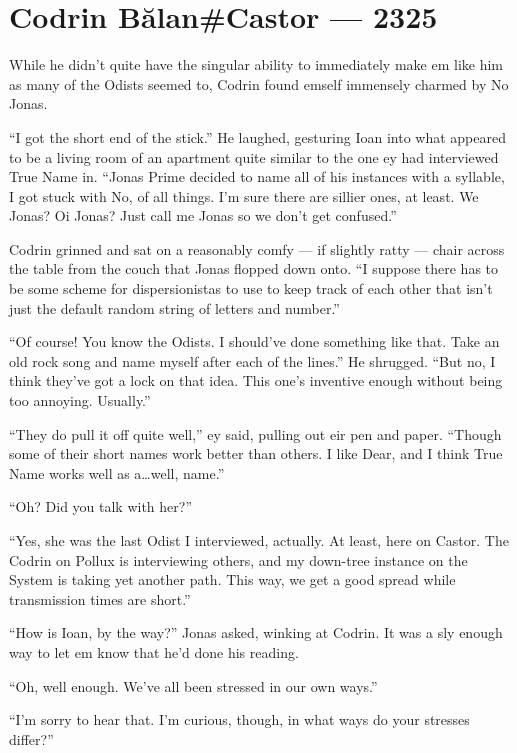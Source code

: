 \hypertarget{codrin-bux103lancastor-2325}{%
\chapter{Codrin Bălan\#Castor — 2325}\label{codrin-bux103lancastor-2325}}

While he didn't quite have the singular ability to immediately make em like him as many of the Odists seemed to, Codrin found emself immensely charmed by No Jonas.

``I got the short end of the stick.'' He laughed, gesturing Ioan into what appeared to be a living room of an apartment quite similar to the one ey had interviewed True Name in. ``Jonas Prime decided to name all of his instances with a syllable, I got stuck with No, of all things. I'm sure there are sillier ones, at least. We Jonas? Oi Jonas? Just call me Jonas so we don't get confused.''

Codrin grinned and sat on a reasonably comfy — if slightly ratty — chair across the table from the couch that Jonas flopped down onto. ``I suppose there has to be some scheme for dispersionistas to use to keep track of each other that isn't just the default random string of letters and number.''

``Of course! You know the Odists. I should've done something like that. Take an old rock song and name myself after each of the lines.'' He shrugged. ``But no, I think they've got a lock on that idea. This one's inventive enough without being too annoying. Usually.''

``They do pull it off quite well,'' ey said, pulling out eir pen and paper. ``Though some of their short names work better than others. I like Dear, and I think True Name works well as a\ldots well, name.''

``Oh? Did you talk with her?''

``Yes, she was the last Odist I interviewed, actually. At least, here on Castor. The Codrin on Pollux is interviewing others, and my down-tree instance on the System is taking yet another path. This way, we get a good spread while transmission times are short.''

``How is Ioan, by the way?'' Jonas asked, winking at Codrin. It was a sly enough way to let em know that he'd done his reading.

``Oh, well enough. We've all been stressed in our own ways.''

``I'm sorry to hear that. I'm curious, though, in what ways do your stresses differ?''

